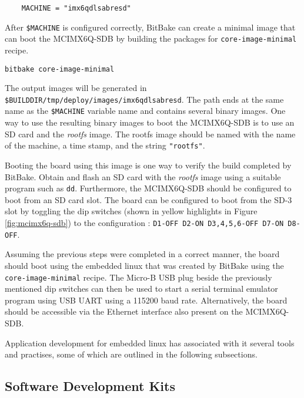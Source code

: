 \begin{verbatim}
	MACHINE = "imx6qdlsabresd"
\end{verbatim}

After \texttt{\$MACHINE} is configured correctly, BitBake can create a minimal image that can boot the MCIMX6Q-SDB by building the packages for \texttt{core-image-minimal} recipe.

\begin{verbatim}
bitbake core-image-minimal
\end{verbatim}

The output images will be generated in \texttt{\$BUILDDIR/tmp/deploy/images/imx6qdlsabresd}. The path ends at the same name as the \texttt{\$MACHINE} variable name and contains several binary images. One way to use the resulting binary images to boot the MCIMX6Q-SDB is to use an SD card and the \textit{rootfs} image. The rootfs image should be named with the name of the machine, a time stamp, and the string \texttt{"rootfs"}.

Booting the board using this image is one way to verify the build completed by BitBake. Obtain and flash an SD card with the \textit{rootfs} image using a suitable program such as \texttt{dd}. Furthermore, the MCIMX6Q-SDB should be configured to boot from an SD card slot. The board can be configured to boot from the SD-3 slot by toggling the dip switches (shown in yellow highlights in Figure \ref{fig:mcimx6q-sdb}) to the configuration : \texttt{D1-OFF D2-ON D3,4,5,6-OFF D7-ON D8-OFF}.

Assuming the previous steps were completed in a correct manner, the board should boot using the embedded linux that was created by BitBake using the \texttt{core-image-minimal} recipe. The Micro-B USB plug beside the previously mentioned dip switches can then be used to start a serial terminal emulator program using USB UART using a 115200 baud rate. Alternatively, the board should be accessible via the Ethernet interface also present on the MCIMX6Q-SDB.




Application development for embedded linux has associated with it several tools and practises, some of which are outlined in the following subsections.

\subsection{Software Development Kits}

